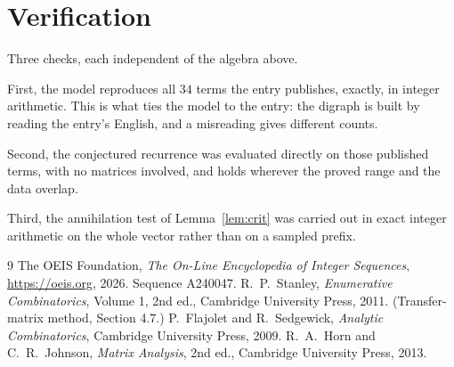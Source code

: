 \documentclass[11pt,a4paper]{article}
\theoremstyle{plain}
\theoremstyle{definition}
\begin{document}
\section{Verification}

Three checks, each independent of the algebra above.

First, the model reproduces all $34$ terms the entry publishes, exactly, in integer
arithmetic. This is what ties the model to the entry: the digraph is built by reading the
entry's English, and a misreading gives different counts.

Second, the conjectured recurrence was evaluated directly on those published terms, with no
matrices involved, and holds wherever the proved range and the data overlap.

Third, the annihilation test of Lemma~\ref{lem:crit} was carried out in exact integer
arithmetic on the whole vector rather than on a sampled prefix.

\begin{thebibliography}{9}
 The OEIS Foundation, \emph{The On-Line Encyclopedia of Integer
Sequences}, \url{https://oeis.org}, 2026. Sequence A240047.
 R.~P.~Stanley, \emph{Enumerative Combinatorics}, Volume 1, 2nd ed.,
Cambridge University Press, 2011. (Transfer-matrix method, Section 4.7.)
 P.~Flajolet and R.~Sedgewick, \emph{Analytic Combinatorics}, Cambridge
University Press, 2009.
 R.~A.~Horn and C.~R.~Johnson, \emph{Matrix Analysis}, 2nd ed., Cambridge
University Press, 2013.
\end{thebibliography}
\end{document}
